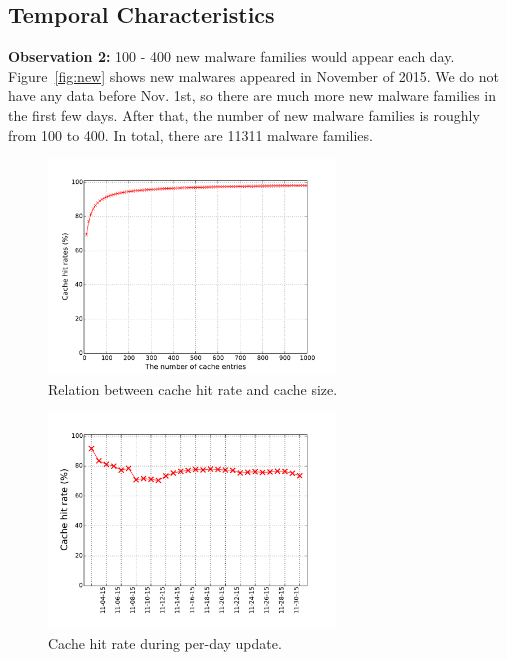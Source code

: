 
\subsection{Temporal Characteristics}
\label{sec:predict}

{\bf Observation 2:} 
100 - 400 new malware families would appear each day. 
Figure~\ref{fig:new} shows new malwares appeared in November of 2015. 
We do not have any data before Nov. 1st, 
so there are much more new malware families in the first few days.
After that, the number of new malware families is roughly from 100 to 400. 
In total, there are 11311 malware families. 

\begin{figure}[t!]
\begin{center}
\includegraphics[width=3.0in]{figure/LRU}
\caption{Relation between cache hit rate and cache size.}
\label{fig:cache}
\end{center}
\end{figure}


\begin{figure}[t!]
\begin{center}
\includegraphics[width=3.0in]{figure/LRU_day}
\caption{Cache hit rate during per-day update.}
\label{fig:batchcache}
\end{center}
\end{figure}

